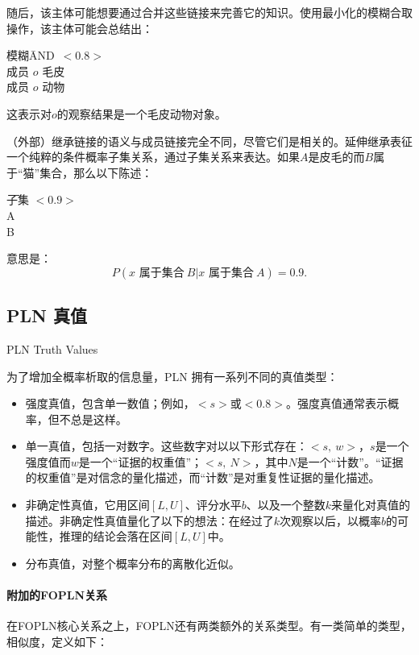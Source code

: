 随后，该主体可能想要通过合并这些链接来完善它的知识。使用最小化的模糊合取操作，该主体可能会总结出：

 \begin{tabbing}
模糊\=AND\ $<0.8>$\\
\> 成员 $o$ 毛皮 \\
\> 成员 $o$ 动物 \\
\end{tabbing}

这表示对$o$的观察结果是一个毛皮动物对象。

（外部）继承链接的语义与成员链接完全不同，尽管它们是相关的。延伸继承表征一个纯粹的条件概率子集关系，通过子集关系来表达。如果$A$是皮毛的而$B$属于“猫”集合，那么以下陈述：

\begin{tabbing}
\=子集 $<0.9>$\\
\>A\\
\>B\\
\end{tabbing}

意思是：$$P(x \mbox{ 属于集合}\ B\vert x \mbox{ 属于集合}\ A) = 0.9.$$ 

\subsection{PLN 真值}{PLN Truth Values}

为了增加全概率析取的信息量，PLN 拥有一系列不同的真值类型：

\begin{itemize}
\item 强度真值，包含单一数值；例如，$<s>$或$<0.8>$。强度真值通常表示概率，但不总是这样。
\item 单一真值，包括一对数字。这些数字对以以下形式存在：$<s,\ w>$，$s$是一个强度值而$w$是一个“证据的权重值”；$<s,\ N>$，其中$N$是一个“计数”。“证据的权重值”是对信念的量化描述，而“计数”是对重复性证据的量化描述。
\item 非确定性真值，它用区间$[L,U]$、评分水平$b$、以及一个整数$k$来量化对真值的描述。非确定性真值量化了以下的想法：在经过了$k$次观察以后，以概率$b$的可能性，推理的结论会落在区间$[L,U]$中。
\item 分布真值，对整个概率分布的离散化近似。
\end{itemize}

\paragraph{附加的FOPLN关系}

在FOPLN核心关系之上，FOPLN还有两类额外的关系类型。有一类简单的类型，相似度，定义如下：

